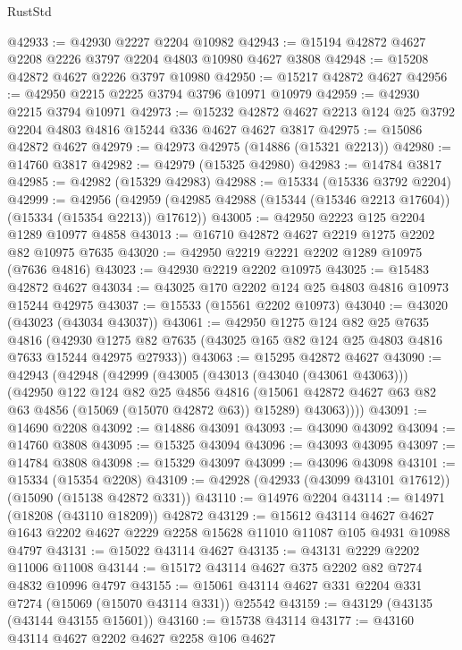 \begin{lexlean}{RustStd}
\begin{coremodule}
@42933 := @42930 @2227 @2204 @10982
@42943 := @15194 @42872 @4627 @2208 @2226 @3797 @2204 @4803 @10980 @4627 @3808
@42948 := @15208 @42872 @4627 @2226 @3797 @10980
@42950 := @15217 @42872 @4627
@42956 := @42950 @2215 @2225 @3794 @3796 @10971 @10979
@42959 := @42930 @2215 @3794 @10971
@42973 := @15232 @42872 @4627 @2213 @124 @25 @3792 @2204 @4803 @4816 @15244 @336 @4627 @4627 @3817
@42975 := @15086 @42872 @4627
@42979 := @42973 @42975 (@14886 (@15321 @2213))
@42980 := @14760 @3817
@42982 := @42979 (@15325 @42980)
@42983 := @14784 @3817
@42985 := @42982 (@15329 @42983)
@42988 := @15334 (@15336 @3792 @2204)
@42999 := @42956
    (@42959 (@42985 @42988 (@15344 (@15346 @2213 @17604)) (@15334 (@15354 @2213)) @17612))
@43005 := @42950 @2223 @125 @2204 @1289 @10977 @4858
@43013 := @16710 @42872 @4627 @2219 @1275 @2202 @82 @10975 @7635
@43020 := @42950 @2219 @2221 @2202 @1289 @10975 (@7636 @4816)
@43023 := @42930 @2219 @2202 @10975
@43025 := @15483 @42872 @4627
@43034 := @43025 @170 @2202 @124 @25 @4803 @4816 @10973 @15244 @42975
@43037 := @15533 (@15561 @2202 @10973)
@43040 := @43020 (@43023 (@43034 @43037))
@43061 := @42950
    @1275
    @124
    @82
    @25
    @7635
    @4816
    (@42930 @1275 @82 @7635 (@43025 @165 @82 @124 @25 @4803 @4816 @7633 @15244 @42975 @27933))
@43063 := @15295 @42872 @4627
@43090 := @42943
    (@42948
      (@42999
        (@43005
          (@43013 (@43040 (@43061 @43063)))
          (@42950
            @122
            @124
            @82
            @25
            @4856
            @4816
            (@15061 @42872 @4627 @63 @82 @63 @4856 (@15069 (@15070 @42872 @63)) @15289)
            @43063))))
@43091 := @14690 @2208
@43092 := @14886 @43091
@43093 := @43090 @43092
@43094 := @14760 @3808
@43095 := @15325 @43094
@43096 := @43093 @43095
@43097 := @14784 @3808
@43098 := @15329 @43097
@43099 := @43096 @43098
@43101 := @15334 (@15354 @2208)
@43109 := @42928 (@42933 (@43099 @43101 @17612)) (@15090 (@15138 @42872 @331))
@43110 := @14976 @2204
@43114 := @14971 (@18208 (@43110 @18209)) @42872
@43129 := @15612
    @43114
    @4627
    @4627
    @1643
    @2202
    @4627
    @2229
    @2258
    @15628
    @11010
    @11087
    @105
    @4931
    @10988
    @4797
@43131 := @15022 @43114 @4627
@43135 := @43131 @2229 @2202 @11006 @11008
@43144 := @15172 @43114 @4627 @375 @2202 @82 @7274 @4832 @10996 @4797
@43155 := @15061 @43114 @4627 @331 @2204 @331 @7274 (@15069 (@15070 @43114 @331)) @25542
@43159 := @43129 (@43135 (@43144 @43155 @15601))
@43160 := @15738 @43114
@43177 := @43160
    @43114
    @4627
    @2202
    @4627
    @2258
    @106
    @4627

\end{coremodule}
\end{lexlean}
